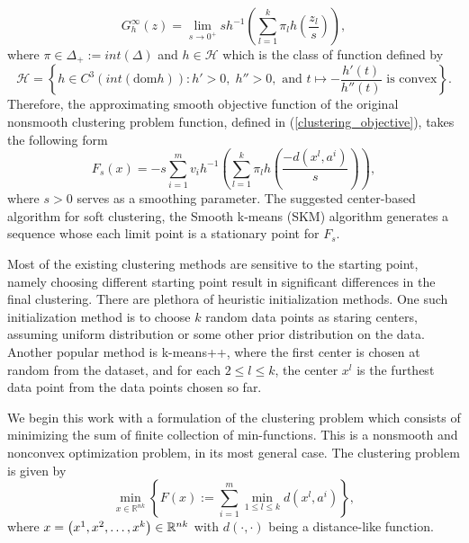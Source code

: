 	\begin{equation*}
		G^{\infty}_h(z) = \lim\limits_{s\rightarrow 0^+} sh^{-1} \left(\sum\limits_{l=1}^k \pi_l h\left(\frac{z_l}{s} \right) \right),
	\end{equation*}
	where $\pi \in \Delta_+:=int\left(\Delta\right)$ and $h \in \mathcal{H}$ which is the class of function defined by
	\begin{equation*}
		\mathcal{H} = \left\lbrace h \in C^3(int(\text{dom}h)) : h'>0, \; h''>0, \text{ and } t\mapsto -\frac{h'(t)}{h''(t)} \text{ is convex}\right\rbrace.
	\end{equation*}
	 Therefore, the approximating smooth objective function of the original nonsmooth clustering problem function, defined in (\ref{clustering_objective}), takes the following form
	\begin{equation*}
		F_s(x) = -s\sum\limits_{i=1}^m v_i h^{-1} \left(\sum\limits_{l=1}^k \pi_l h\left(\frac{-d\left(x^l,a^i\right)}{s} \right) \right),
	\end{equation*}
	where $s>0$ serves as a smoothing parameter. The suggested center-based algorithm for soft clustering, the Smooth k-means (SKM) algorithm generates a sequence whose each limit point is a stationary point for $F_s$.\medskip

Most of the existing clustering methods are sensitive to the starting point, namely choosing different starting point result in significant differences in the final clustering. There are plethora of heuristic initialization methods. One such initialization method is to choose $k$ random data points as staring centers, assuming uniform distribution or some other prior distribution on the data. Another popular method is k-means++, where the first center is chosen at random from the dataset, and for each $2 \leq l \leq k$, the center $x^l$ is the furthest data point from the data points chosen so far. \medskip

We begin this work with a formulation of the clustering problem which consists of minimizing the sum of finite collection of min-functions. This is a nonsmooth and nonconvex optimization problem, in its most general case. The clustering problem is given by
\begin{equation}
	\min\limits_{x \in \mathbb{R}^{nk}} \left\lbrace F(x) := \sum\limits_{i=1}^{m} \min\limits_{1 \le l \le k} d(x^l,a^i) \right\rbrace , \label{StateEq1}
\end{equation}
where $x=\left( x^1,x^2, \ldots, x^k \right) \in \mathbb{R}^{nk}$ with $\textit{d}(\cdot ,\cdot)$ being a distance-like function. \medskip


